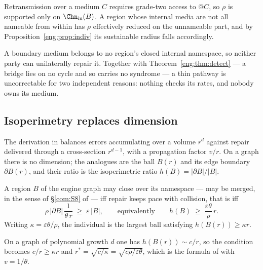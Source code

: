 \begin{proposition}
\label{eng:prop:closurerepair}
Retransmission over a medium $C$ requires grade-two access to $@C$, so
$\rho$ is supported only on $\Chn_{\mathrm{in}}(B)$. A region whose
internal media are not all nameable from within has $\rho$ effectively
reduced on the unnameable part, and by
Proposition~\ref{eng:prop:indiv} its sustainable radius falls accordingly.
\end{proposition}

\begin{corollary}\label{eng:bridges-fail-twice}
A boundary medium belongs to no region's closed internal namespace, so
neither party can unilaterally repair it. Together with
Theorem~\ref{eng:thm:detect} --- a bridge lies on no cycle and so carries no
syndrome --- a thin pathway is uncorrectable for two independent reasons:
nothing checks its rates, and nobody owns its medium.
\end{corollary}

\subsection{Isoperimetry replaces dimension}\label{eng:S8.3}

The derivation in \cite{compaut} balances errors accumulating over a volume
$r^d$ against repair delivered through a cross-section $r^{d-1}$, with a
propagation factor $v/r$. On a graph there is no dimension; the analogues
are the ball $B(r)$ and its edge boundary $\partial B(r)$, and their ratio
is the isoperimetric ratio $h(B) = |\partial B| / |B|$.

\begin{proposition}\label{eng:prop:indiv}
A region $B$ of the engine graph may close over its namespace --- may be
merged, in the sense of \S\ref{com:S8} of \chComp --- iff repair keeps pace with
collision, that is iff
\[
  \rho\,|\partial B|\,\frac{1}{\theta\,r} \;\geq\; \varepsilon\,|B|,
  \qquad\text{equivalently}\qquad
  h(B) \;\geq\; \frac{\varepsilon\theta}{\rho}\, r .
\]
Writing $\kappa = \varepsilon\theta/\rho$, the individual is the largest
ball satisfying $h(B(r)) \geq \kappa r$.
\end{proposition}

\begin{corollary}\label{eng:recovering-r}
On a graph of polynomial growth $d$ one has $h(B(r)) \sim c/r$, so the
condition becomes $c/r \geq \kappa r$ and
$r^\ast = \sqrt{c/\kappa} = \sqrt{c\rho/\varepsilon\theta}$, which is the
formula of \cite{compaut} with $v = 1/\theta$.
\end{corollary}

